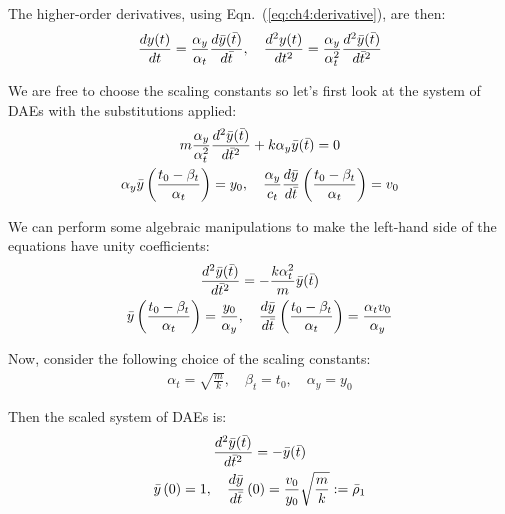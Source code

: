 \noindent The higher-order derivatives, using Eqn.~(\ref{eq:ch4:derivative}), are then:
\begin{align}
\frac{dy(t)}{dt} = \frac{\alpha_y}{\alpha_t} \frac{d\bar{y}(\bar{t})}{d\bar{t}}, \quad \frac{d^2y(t)}{dt^2} = \frac{\alpha_y}{\alpha_t^2} \frac{d^2\bar{y}(\bar{t})}{d\bar{t}^2}
\end{align}

We are free to choose the scaling constants so let's first look at the system of DAEs with the substitutions applied:
\begin{subequations}
\begin{gather}
m \frac{\alpha_y}{\alpha_t^2} \frac{d^2\bar{y}(\bar{t})}{d\bar{t}^2} + k \alpha_y \bar{y}(\bar{t}) = 0 \\
\alpha_y \bar{y}\left( \frac{t_0-\beta_t}{\alpha_t} \right) = y_0, \quad \frac{\alpha_y}{c_t} \frac{d \bar{y}}{d\bar{t}}\left( \frac{t_0-\beta_t}{\alpha_t} \right) = v_0
\end{gather} 
\end{subequations}

\noindent We can perform some algebraic manipulations to make the left-hand side of the equations have unity coefficients:
\begin{subequations}
\begin{gather}
\frac{d^2\bar{y}(\bar{t})}{d\bar{t}^2} = - \frac{k \alpha_t^2}{m} \bar{y}(\bar{t}) \\
\bar{y}\left( \frac{t_0-\beta_t}{\alpha_t} \right) = \frac{y_0}{\alpha_y}, \quad \frac{d \bar{y}}{d\bar{t}}\left( \frac{t_0-\beta_t}{\alpha_t} \right) = \frac{\alpha_t v_0}{\alpha_y}
\end{gather} 
\end{subequations}

\noindent Now, consider the following choice of the scaling constants:
\begin{align}
\alpha_t = \sqrt{\frac{m}{k}}, \quad \beta_t = t_0,\quad \alpha_y = y_0
\end{align}

\noindent Then the scaled system of DAEs is:
\begingroup
\allowdisplaybreaks
\begin{subequations}
\begin{gather}
\frac{d^2\bar{y}(\bar{t})}{d\bar{t}^2} = - \bar{y}(\bar{t}) \\
\bar{y}\left( 0 \right) = 1, \quad \frac{d \bar{y}}{d\bar{t}}\left( 0 \right) = \frac{v_0}{y_0} \sqrt{\frac{m}{k}} := \bar{\rho}_1
\end{gather} 
\end{subequations}%
\endgroup

